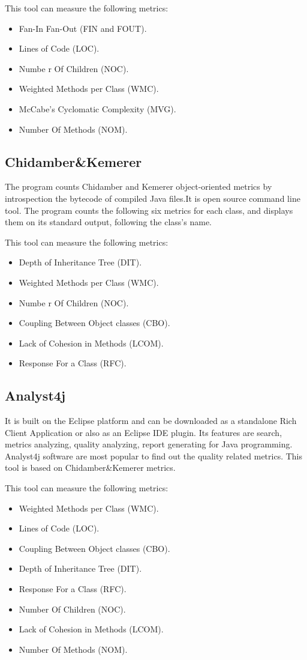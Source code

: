 This tool can measure the following metrics:
\begin{itemize}
	\item Fan-In Fan-Out (FIN and FOUT).
	\item Lines of Code (LOC). 
	\item Numbe r Of Children (NOC).
	\item Weighted Methods per Class (WMC).
	\item McCabe's Cyclomatic Complexity (MVG).
	\item Number Of Methods (NOM).
\end{itemize}

\subsection{Chidamber\&Kemerer}

The program counts Chidamber and Kemerer object-oriented metrics by introspection the bytecode of compiled Java files.It is open source command line tool. The program counts the following six metrics for each class, and displays them on its standard output, following the class's name.

This tool can measure the following metrics:

\begin{itemize}
	\item Depth of Inheritance Tree (DIT).
	\item Weighted Methods per Class (WMC).
	\item Numbe r Of Children (NOC).
	\item Coupling Between Object classes (CBO).
	\item Lack of Cohesion in Methods (LCOM).
	\item Response For a Class (RFC).
\end{itemize}

\subsection{Analyst4j}
It is built on the Eclipse platform and can be downloaded as a standalone Rich Client Application or also as an Eclipse
IDE plugin. Its features are search, metrics analyzing, quality analyzing, report generating for Java programming.
Analyst4j software are most popular to find out the quality related metrics. This tool is based on Chidamber\&Kemerer metrics.

This tool can measure the following metrics:
\begin{itemize}
	\item Weighted Methods per Class (WMC).
	\item Lines of Code (LOC). 
	\item Coupling Between Object classes (CBO).
	\item Depth of Inheritance Tree (DIT).
	\item Response For a Class (RFC).
	\item Number Of Children (NOC).
	\item Lack of Cohesion in Methods (LCOM).
	\item Number Of Methods (NOM).
\end{itemize}


